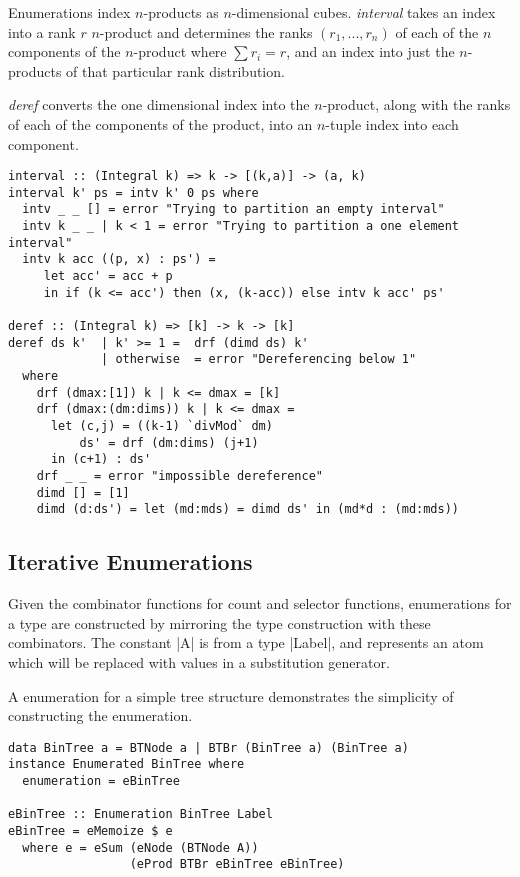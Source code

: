 Enumerations index $n$-products as $n$-dimensional cubes.
\emph{interval} takes an index into a rank $r$ $n$-product and determines the 
ranks $(r_1, ..., r_n)$ of each of the $n$ components of the $n$-product where 
$\sum r_{i} = r$, and an index into just the $n$-products of that particular rank
distribution.

\emph{deref} converts the one dimensional index into the $n$-product,
along with the ranks of each of the components of the product,
into an $n$-tuple index into each component.

\begin{lstlisting}
interval :: (Integral k) => k -> [(k,a)] -> (a, k)
interval k' ps = intv k' 0 ps where
  intv _ _ [] = error "Trying to partition an empty interval"
  intv k _ _ | k < 1 = error "Trying to partition a one element interval"
  intv k acc ((p, x) : ps') = 
     let acc' = acc + p 
     in if (k <= acc') then (x, (k-acc)) else intv k acc' ps'

deref :: (Integral k) => [k] -> k -> [k]
deref ds k'  | k' >= 1 =  drf (dimd ds) k'
             | otherwise  = error "Dereferencing below 1"
  where
    drf (dmax:[1]) k | k <= dmax = [k]
    drf (dmax:(dm:dims)) k | k <= dmax =
      let (c,j) = ((k-1) `divMod` dm)
          ds' = drf (dm:dims) (j+1)
      in (c+1) : ds'
    drf _ _ = error "impossible dereference"
    dimd [] = [1]
    dimd (d:ds') = let (md:mds) = dimd ds' in (md*d : (md:mds))
\end{lstlisting}

\subsection{Iterative Enumerations}
Given the combinator functions for count and selector functions,
enumerations for a type are constructed by mirroring the type construction
with these combinators.
The constant |A| is from a type |Label|, and represents an atom
which will be replaced with values in a \GC substitution generator.

A \GC enumeration for a simple tree structure demonstrates the simplicity of constructing the enumeration.

\begin{lstlisting}
data BinTree a = BTNode a | BTBr (BinTree a) (BinTree a)
instance Enumerated BinTree where
  enumeration = eBinTree

eBinTree :: Enumeration BinTree Label
eBinTree = eMemoize $ e
  where e = eSum (eNode (BTNode A)) 
                 (eProd BTBr eBinTree eBinTree)

\end{lstlisting}


